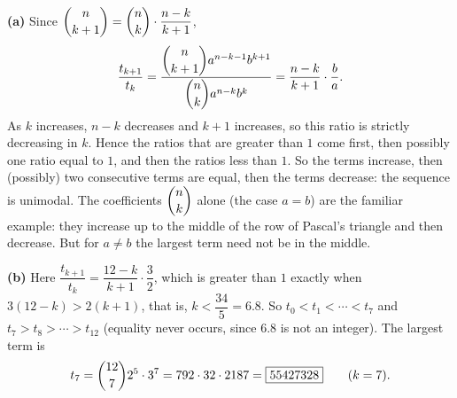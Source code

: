 \textbf{(a)} Since $\dbinom{n}{k+1}=\dbinom{n}{k}\cdot\dfrac{n-k}{k+1}$,
\[
\dfrac{t_{k+1}}{t_k}=\dfrac{\dbinom{n}{k+1}a^{n-k-1}b^{k+1}}{\dbinom{n}{k}a^{n-k}b^{k}}=\dfrac{n-k}{k+1}\cdot\dfrac{b}{a}.
\]
As $k$ increases, $n-k$ decreases and $k+1$ increases, so this ratio is strictly decreasing in $k$. Hence the ratios that are greater than $1$ come first, then possibly one ratio equal to $1$, and then the ratios less than $1$. So the terms increase, then (possibly) two consecutive terms are equal, then the terms decrease: the sequence is unimodal. The coefficients $\dbinom{n}{k}$ alone (the case $a=b$) are the familiar example: they increase up to the middle of the row of Pascal's triangle and then decrease. But for $a\ne b$ the largest term need not be in the middle.

\textbf{(b)} Here $\dfrac{t_{k+1}}{t_k}=\dfrac{12-k}{k+1}\cdot\dfrac{3}{2}$, which is greater than $1$ exactly when $3(12-k)>2(k+1)$, that is, $k<\dfrac{34}{5}=6.8$. So $t_0<t_1<\cdots<t_7$ and $t_7>t_8>\cdots>t_{12}$ (equality never occurs, since $6.8$ is not an integer). The largest term is
\[
t_7=\dbinom{12}{7}2^5\cdot3^7=792\cdot32\cdot2187=\boxed{55427328}\qquad(k=7).
\]
